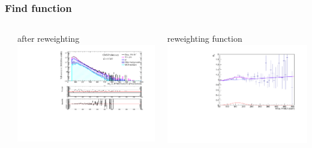 \documentclass[bigger]{beamer}
\begin{document}
\begin{frame}
\frametitle{Find \mt function}
\label{sec-1-9-6}
\begin{columns} %
\label{sec-1-9-6-1}
\begin{column}{0.6\textwidth}
\label{sec-1-9-6-1-1}

\centering
\mt after \met reweighting
\includegraphics[width=\textwidth]{fig/enu/reweight/MTenu_PAS_enujjMETReweighted.pdf}
\end{column}
\begin{column}{0.6\textwidth}
\label{sec-1-9-6-1-2}

\centering
\met reweighting function
\includegraphics[width=\textwidth]{fig/enu/reweight/canvas_mt.pdf}
\end{column}
\end{columns}
\label{sec-1-9-6-2}

\centering
{}
\end{frame}
\end{document}
